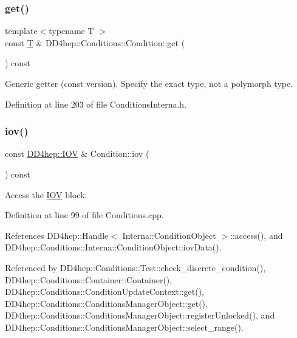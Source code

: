 \subsubsection{\texorpdfstring{get()}{get()}\hspace{0.1cm}{\footnotesize\ttfamily [2/2]}}
{\footnotesize\ttfamily template$<$typename T $>$ \\
const \hyperlink{class_t}{T} \& D\+D4hep\+::\+Conditions\+::\+Condition\+::get (\begin{DoxyParamCaption}{ }\end{DoxyParamCaption}) const}



Generic getter (const version). Specify the exact type, not a polymorph type. 



Definition at line 203 of file Conditions\+Interna.\+h.

\hypertarget{class_d_d4hep_1_1_conditions_1_1_condition_a9370350f5fb154e29346489c368f3e8a}{}\label{class_d_d4hep_1_1_conditions_1_1_condition_a9370350f5fb154e29346489c368f3e8a} 
\subsubsection{\texorpdfstring{iov()}{iov()}}
{\footnotesize\ttfamily const \hyperlink{class_d_d4hep_1_1_i_o_v}{D\+D4hep\+::\+I\+OV} \& Condition\+::iov (\begin{DoxyParamCaption}{ }\end{DoxyParamCaption}) const}



Access the \hyperlink{class_d_d4hep_1_1_i_o_v}{I\+OV} block. 



Definition at line 99 of file Conditions.\+cpp.



References D\+D4hep\+::\+Handle$<$ Interna\+::\+Condition\+Object $>$\+::access(), and D\+D4hep\+::\+Conditions\+::\+Interna\+::\+Condition\+Object\+::iov\+Data().



Referenced by D\+D4hep\+::\+Conditions\+::\+Test\+::check\+\_\+discrete\+\_\+condition(), D\+D4hep\+::\+Conditions\+::\+Container\+::\+Container(), D\+D4hep\+::\+Conditions\+::\+Condition\+Update\+Context\+::get(), D\+D4hep\+::\+Conditions\+::\+Conditions\+Manager\+Object\+::get(), D\+D4hep\+::\+Conditions\+::\+Conditions\+Manager\+Object\+::register\+Unlocked(), and D\+D4hep\+::\+Conditions\+::\+Conditions\+Manager\+Object\+::select\+\_\+range().

